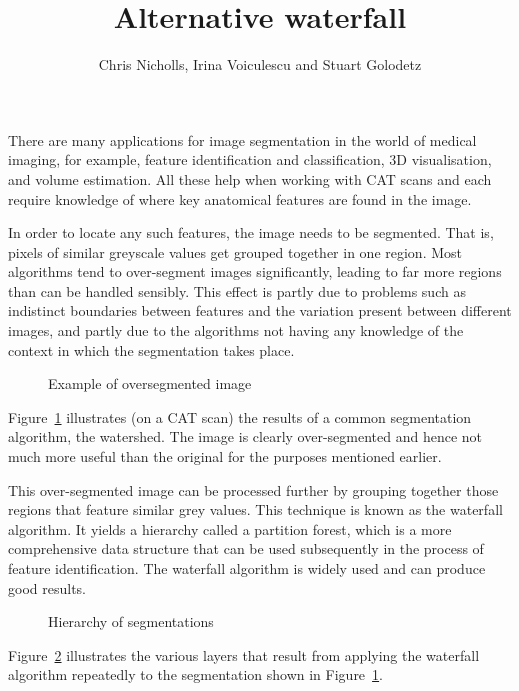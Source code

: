 \documentclass{ouclprgsc}
\title{\LARGE \bf
Alternative waterfall
}
\author{Chris Nicholls, Irina Voiculescu and Stuart Golodetz
}
\institute{Oxford University Computing Laboratory}
\begin{document}
\maketitle
\pagestyle{empty}



There are many applications for image segmentation in the world of
medical imaging, for example, feature identification and
classification, 3D visualisation, and volume estimation. All these
help when working with CAT scans and each require knowledge of where
key anatomical features are found in the image.

In order to locate any such features, the image needs to be
segmented. That is, pixels of similar greyscale values get grouped
together in one region. Most algorithms tend to over-segment images
significantly, leading to far more regions than can be handled
sensibly. This effect is partly due to problems such as indistinct
boundaries between features and the variation present between
different images, and partly due to the algorithms not having any
knowledge of the context in which the segmentation takes place.

\begin{figure}
\centering
\ifpdf
        {}%
\else
\fi
\caption{Example of oversegmented image}
\label{fig:oversegmented}
\end{figure}

Figure~\ref{fig:oversegmented} illustrates (on a CAT scan) the results
of a common segmentation algorithm, the watershed. The image is
clearly over-segmented and hence not much more useful than the
original for the purposes mentioned earlier.

This over-segmented image can be processed further by grouping
together those regions that feature similar grey values. This
technique is known as the waterfall algorithm. It yields a hierarchy
called a partition forest, which is a more comprehensive data
structure that can be used subsequently in the process of feature
identification. The waterfall algorithm is widely used and can produce
good results.

\begin{figure}
\centering
\ifpdf
        {}%
\else
\fi
\caption{Hierarchy of segmentations}
\label{fig:waterfall}
\end{figure}

Figure~\ref{fig:waterfall} illustrates the various layers that result
from applying the waterfall algorithm repeatedly to the segmentation
shown in Figure~\ref{fig:oversegmented}.
\end{document}
